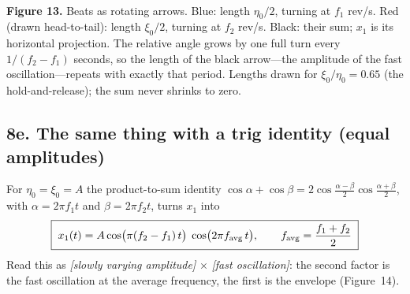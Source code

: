 \documentclass[11pt,a4paper]{article}
\begin{document}
\begin{center}
\\[2pt]
{\small\textbf{Figure 13.} Beats as rotating arrows. Blue: length $\eta_0/2$, turning at $f_1$ rev/s. Red (drawn head-to-tail): length $\xi_0/2$, turning at $f_2$ rev/s. Black: their sum; $x_1$ is its horizontal projection. The relative angle grows by one full turn every $1/(f_2-f_1)$ seconds, so the length of the black arrow---the amplitude of the fast oscillation---repeats with exactly that period. Lengths drawn for $\xi_0/\eta_0=0.65$ (the hold-and-release); the sum never shrinks to zero.}
\end{center}

\subsection*{8e. The same thing with a trig identity (equal amplitudes)}

For $\eta_0=\xi_0=A$ the product-to-sum identity $\cos\alpha+\cos\beta=2\cos\frac{\alpha-\beta}{2}\cos\frac{\alpha+\beta}{2}$, with $\alpha=2\pi f_1t$ and $\beta=2\pi f_2t$, turns $x_1$ into
\begin{equation}
\boxed{\;x_1(t)=A\cos\!\big(\pi(f_2-f_1)\,t\big)\;\cos\!\big(2\pi f_{\rm avg}\,t\big),\qquad f_{\rm avg}=\frac{f_1+f_2}{2}\;}
\label{eq:beats}
\end{equation}
Read this as \emph{[slowly varying amplitude]} $\times$ \emph{[fast oscillation]}: the second factor is the fast oscillation at the average frequency, the first is the envelope (Figure~14).
\end{document}
